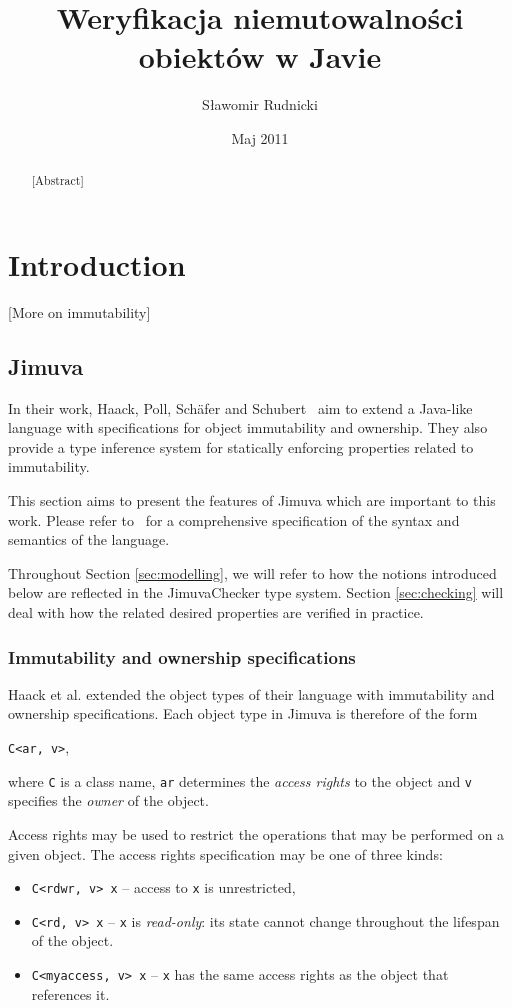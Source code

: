 \documentclass{pracamgr}
\author{Sławomir Rudnicki}
\title{Weryfikacja niemutowalności obiektów w Javie}
\date{Maj 2011}
\theoremstyle{all}
\newcommand{\todo}[1]{{\color{red} [#1] }}
\begin{document}
\maketitle

\begin{abstract}
  \todo{Abstract}
\end{abstract}

\tableofcontents

\chapter{Introduction}
\label{chap:intro}

\todo{More on immutability}

\section{Jimuva}
\label{sec:jimuva}

In their work, Haack, Poll, Schäfer and Schubert~\cite{haack} aim to
extend a Java-like language with specifications for object
immutability and ownership. They also provide a type inference system
for statically enforcing properties related to immutability.

This section aims to present the features of Jimuva which are
important to this work. Please refer to~\cite{haack} for a
comprehensive specification of the syntax and semantics of the
language. 

Throughout Section \ref{sec:modelling}, we will refer to how the
notions introduced below are reflected in the JimuvaChecker type
system. Section \ref{sec:checking} will deal with how the related
desired properties are verified in practice.

\subsection{Immutability and ownership specifications}
\label{subsec:imm-spec}

Haack et al. extended the object types of their language with
immutability and ownership specifications. Each object type in Jimuva
is therefore of the form
\begin{center}
  \texttt{C<ar, v>},
\end{center}
where \texttt{C} is a class name, \texttt{ar} determines the
\emph{access rights} to the object and \texttt{v} specifies the
\emph{owner} of the object.

Access rights may be used to restrict the operations that may be
performed on a given object. The access rights specification may be
one of three kinds:
\begin{itemize}
\item \texttt{C<rdwr, v> x} -- access to \texttt{x} is unrestricted, 
\item \texttt{C<rd, v> x} -- \texttt{x} is \emph{read-only}: its state
  cannot change throughout the lifespan of the object.
\item \texttt{C<myaccess, v> x} -- \texttt{x} has the same access
  rights as the object that references it.
\end{itemize}
\end{document}
